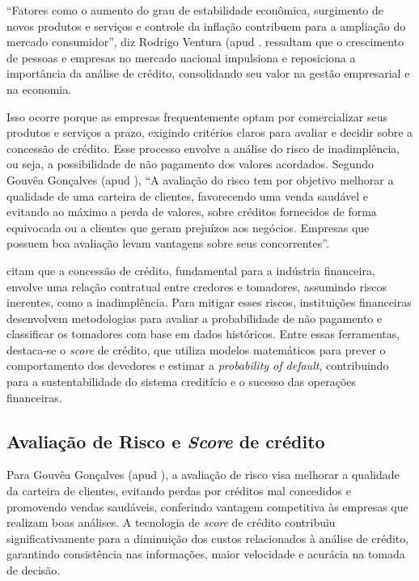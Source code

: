 \documentclass[12pt,a4paper]{article}
\begin{document}
“Fatores como o aumento do grau de estabilidade econômica, surgimento de novos produtos e serviços e controle da inflação contribuem para a ampliação do mercado consumidor”, diz Rodrigo Ventura (apud \cite{fuhr2022}. \cite{fuhr2022} ressaltam que o crescimento de pessoas e empresas no mercado nacional impulsiona e reposiciona a importância da análise de crédito, consolidando seu valor na gestão empresarial e na economia. 

Isso ocorre porque as empresas frequentemente optam por comercializar seus produtos e serviços a prazo, exigindo critérios claros para avaliar e decidir sobre a concessão de crédito. Esse processo envolve a análise do risco de inadimplência, ou seja, a possibilidade de não pagamento dos valores acordados. Segundo Gouvêa Gonçalves (apud \cite{fuhr2022}), “A avaliação do risco tem por objetivo melhorar a qualidade de uma carteira de clientes, favorecendo uma venda saudável e evitando ao máximo a perda de valores, sobre créditos fornecidos de forma equivocada ou a clientes que geram prejuízos aos negócios. Empresas que possuem boa avaliação levam vantagens sobre seus concorrentes”. 

\cite{montevechi2022} citam que a concessão de crédito, fundamental para a indústria financeira, envolve uma relação contratual entre credores e tomadores, assumindo riscos inerentes, como a inadimplência. Para mitigar esses riscos, instituições financeiras desenvolvem metodologias para avaliar a probabilidade de não pagamento e classificar os tomadores com base em dados históricos. Entre essas ferramentas, destaca-se o \textit{score} de crédito, que utiliza modelos matemáticos para prever o comportamento dos devedores e estimar a \textit{probability of default}, contribuindo para a sustentabilidade do sistema creditício e o sucesso das operações financeiras.
\subsection{Avaliação de Risco e \textit{Score} de crédito}

Para Gouvêa Gonçalves (apud \cite{fuhr2022}), a avaliação de risco visa melhorar a qualidade da carteira de clientes, evitando perdas por créditos mal concedidos e promovendo vendas saudáveis, conferindo vantagem competitiva às empresas que realizam boas análises. A tecnologia de \textit{score} de crédito contribuiu significativamente para a diminuição dos custos relacionados à análise de crédito, garantindo consistência nas informações, maior velocidade e acurácia na tomada de decisão.
\end{document}
